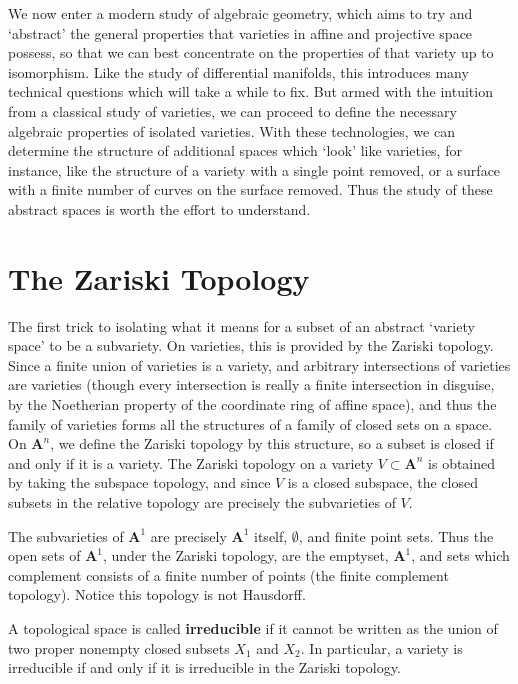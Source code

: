 We now enter a modern study of algebraic geometry, which aims to try and `abstract' the general properties that varieties in affine and projective space possess, so that we can best concentrate on the properties of that variety up to isomorphism. Like the study of differential manifolds, this introduces many technical questions which will take a while to fix. But armed with the intuition from a classical study of varieties, we can proceed to define the necessary algebraic properties of isolated varieties. With these technologies, we can determine the structure of additional spaces which `look' like varieties, for instance, like the structure of a variety with a single point removed, or a surface with a finite number of curves on the surface removed. Thus the study of these abstract spaces is worth the effort to understand.

\section{The Zariski Topology}

The first trick to isolating what it means for a subset of an abstract `variety space' to be a subvariety. On varieties, this is provided by the Zariski topology. Since a finite union of varieties is a variety, and arbitrary intersections of varieties are varieties (though every intersection is really a finite intersection in disguise, by the Noetherian property of the coordinate ring of affine space), and thus the family of varieties forms all the structures of a family of closed sets on a space. On $\mathbf{A}^n$, we define the Zariski topology by this structure, so a subset is closed if and only if it is a variety. The Zariski topology on a variety $V \subset \mathbf{A}^n$ is obtained by taking the subspace topology, and since $V$ is a closed subspace, the closed subsets in the relative topology are precisely the subvarieties of $V$.

\begin{example}
    The subvarieties of $\mathbf{A}^1$ are precisely $\mathbf{A}^1$ itself, $\emptyset$, and finite point sets. Thus the open sets of $\mathbf{A}^1$, under the Zariski topology, are the emptyset, $\mathbf{A}^1$, and sets which complement consists of a finite number of points (the finite complement topology). Notice this topology is not Hausdorff.
\end{example}

A topological space is called {\bf irreducible} if it cannot be written as the union of two proper nonempty closed subsets $X_1$ and $X_2$. In particular, a variety is irreducible if and only if it is irreducible in the Zariski topology.

